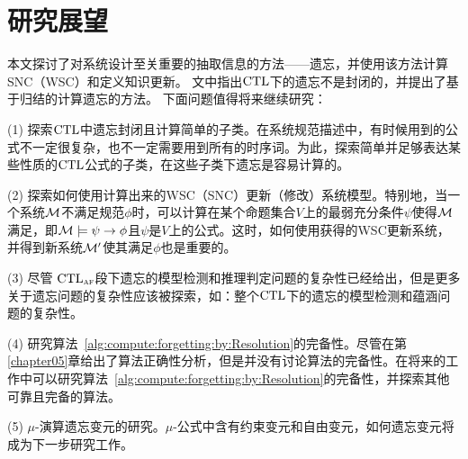 \section{研究展望}
本文探讨了对系统设计至关重要的抽取信息的方法——遗忘，并使用该方法计算SNC（WSC）和定义知识更新。
文中指出$\textrm{CTL}$下的遗忘不是封闭的，并提出了基于归结的计算遗忘的方法。
下面问题值得将来继续研究：

(1) 探索$\textrm{CTL}$中遗忘封闭且计算简单的子类。在系统规范描述中，有时候用到的公式不一定很复杂，也不一定需要用到所有的时序词。为此，探索简单并足够表达某些性质的$\textrm{CTL}$公式的子类，在这些子类下遗忘是容易计算的。

(2) 探索如何使用计算出来的WSC（SNC）更新（修改）系统模型。特别地，当一个系统$\cal M$不满足规范$\phi$时，可以计算在某个命题集合$V$上的最弱充分条件$\psi$使得${\cal M}$满足，即${\cal M}\models\psi\rightarrow \phi$且$\psi$是$V$上的公式。这时，如何使用获得的WSC更新系统，并得到新系统${\cal M}'$使其满足$\phi$也是重要的。


(3) 尽管 $\textrm{CTL}_{\textsc{a}\textsc{f}}$段下遗忘的模型检测和推理判定问题的复杂性已经给出，但是更多关于遗忘问题的复杂性应该被探索，如：整个$\textrm{CTL}$下的遗忘的模型检测和蕴涵问题的复杂性。

(4) 研究算法~\ref{alg:compute:forgetting:by:Resolution}的完备性。尽管在第\ref{chapter05}章给出了算法正确性分析，但是并没有讨论算法的完备性。在将来的工作中可以研究算法~\ref{alg:compute:forgetting:by:Resolution}的完备性，并探索其他可靠且完备的算法。

(5) $\mu$-演算遗忘变元的研究。$\mu$-公式中含有约束变元和自由变元，如何遗忘变元将成为下一步研究工作。